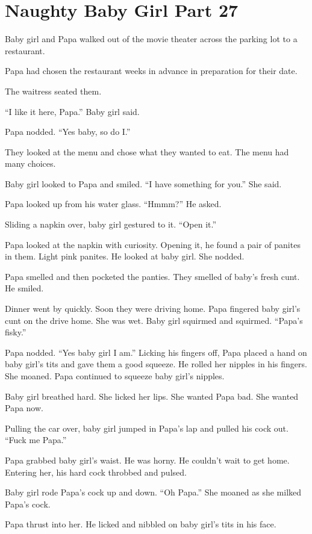 \section{Naughty Baby Girl Part 27}

    Baby girl and Papa walked out of the movie theater across the parking lot to a restaurant.

    Papa had chosen the restaurant weeks in advance in preparation for their date.

    The waitress seated them.

    “I like it here, Papa.” Baby girl said.

    Papa nodded. “Yes baby, so do I.”

    They looked at the menu and chose what they wanted to eat. The menu had many choices.

    Baby girl looked to Papa and smiled. “I have something for you.” She said.

    Papa looked up from his water glass. “Hmmm?” He asked.

    Sliding a napkin over, baby girl gestured to it. “Open it.”

    Papa looked at the napkin with curiosity. Opening it, he found a pair of panites in them. Light pink panites. He looked at baby girl. She nodded.

    Papa smelled and then pocketed the panties. They smelled of baby’s fresh cunt. He smiled.

    Dinner went by quickly. Soon they were driving home. Papa fingered baby girl’s cunt on the drive home. She was wet. Baby girl squirmed and squirmed. “Papa’s fisky.”

    Papa nodded. “Yes baby girl I am.” Licking his fingers off, Papa placed a hand on baby girl’s tits and gave them a good squeeze. He rolled her nipples in his fingers. She moaned. Papa continued to squeeze baby girl’s nipples.

    Baby girl breathed hard. She licked her lips. She wanted Papa bad. She wanted Papa now.

    Pulling the car over, baby girl jumped in Papa’s lap and pulled his cock out. “Fuck me Papa.”

    Papa grabbed baby girl’s waist. He was horny. He couldn’t wait to get home. Entering her, his hard cock throbbed and pulsed.

    Baby girl rode Papa’s cock up and down. “Oh Papa.” She moaned as she milked Papa’s cock.

    Papa thrust into her. He licked and nibbled on baby girl’s tits in his face.

